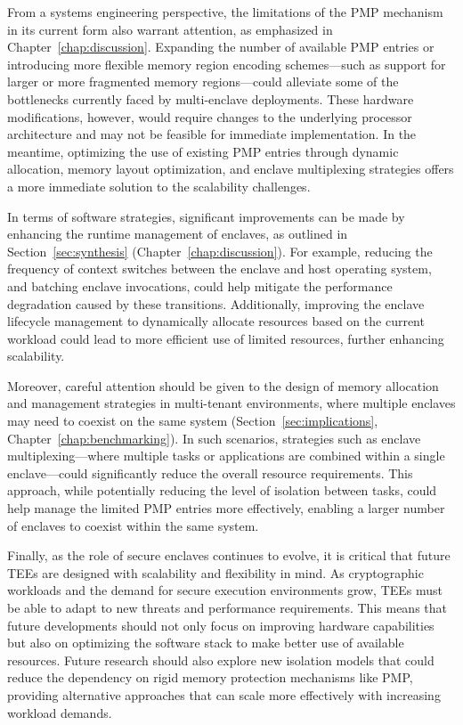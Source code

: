 From a systems engineering perspective, the limitations of the PMP mechanism in its current form also warrant attention, as emphasized in Chapter~\ref{chap:discussion}. Expanding the number of available PMP entries or introducing more flexible memory region encoding schemes—such as support for larger or more fragmented memory regions—could alleviate some of the bottlenecks currently faced by multi-enclave deployments. These hardware modifications, however, would require changes to the underlying processor architecture and may not be feasible for immediate implementation. In the meantime, optimizing the use of existing PMP entries through dynamic allocation, memory layout optimization, and enclave multiplexing strategies offers a more immediate solution to the scalability challenges.

In terms of software strategies, significant improvements can be made by enhancing the runtime management of enclaves, as outlined in Section~\ref{sec:synthesis} (Chapter~\ref{chap:discussion}). For example, reducing the frequency of context switches between the enclave and host operating system, and batching enclave invocations, could help mitigate the performance degradation caused by these transitions. Additionally, improving the enclave lifecycle management to dynamically allocate resources based on the current workload could lead to more efficient use of limited resources, further enhancing scalability.

Moreover, careful attention should be given to the design of memory allocation and management strategies in multi-tenant environments, where multiple enclaves may need to coexist on the same system (Section~\ref{sec:implications}, Chapter~\ref{chap:benchmarking}). In such scenarios, strategies such as enclave multiplexing—where multiple tasks or applications are combined within a single enclave—could significantly reduce the overall resource requirements. This approach, while potentially reducing the level of isolation between tasks, could help manage the limited PMP entries more effectively, enabling a larger number of enclaves to coexist within the same system.

Finally, as the role of secure enclaves continues to evolve, it is critical that future TEEs are designed with scalability and flexibility in mind. As cryptographic workloads and the demand for secure execution environments grow, TEEs must be able to adapt to new threats and performance requirements. This means that future developments should not only focus on improving hardware capabilities but also on optimizing the software stack to make better use of available resources. Future research should also explore new isolation models that could reduce the dependency on rigid memory protection mechanisms like PMP, providing alternative approaches that can scale more effectively with increasing workload demands.

